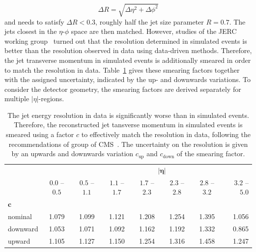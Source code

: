 \begin{equation}
\Delta R = \sqrt{\Delta \eta^2 + \Delta \phi^2}
\end{equation}
%
and needs to satisfy $\Delta R < 0.3$, roughly half the jet size parameter
$R=0.7$. The jets closest in the $\eta$-$\phi$ space are then matched. However,
studies of the \textsc{JERC} working group~\cite{jetmet:resolution} turned out that the resolution
determined in simulated events is better than the resolution observed in data
using data-driven methods. Therefore, the jet transverse momentum in simulated
events is additionally smeared in order to match the resolution in data.
Table~\ref{tab:res_smearing} gives these smearing factors together with the
assigned uncertainty, indicated by the up- and downwards variations. To consider
the detector geometry, the smearing factors are derived separately for multiple
$|\eta|$-regions.

\begin{table}[htbp]
\setlength\tabcolsep{4.5pt} 
    \centering
    \caption[Jet energy resolution scale factors]{
             The jet energy resolution in data is significantly worse than in
             simulated events. Therefore, the reconstructed jet tansverse
             momentum in simulated events is smeared using a factor $c$ to
             effectively match the resolution in data, following the
             recommendations of \JetMET group of CMS~\cite{jetmet:resolution}.
             The uncertainty on the resolution is given by an upwards and
             downwards variation $c_\mathrm{up}$ and
             $c_\mathrm{down}$ of the smearing factor.}
    \label{tab:res_smearing}

    \begin{tabular}{lccccccr}
    \toprule
    & & \multicolumn{6}{c}{$\bm{|\eta|}$}\\\cmidrule{2-8}
               & $0.0$ -- $0.5$ & $0.5$ -- $1.1$ & $1.1$ -- $1.7$ & $1.7$ --
               $2.3$ & $2.3$ -- $2.8$ & $2.8$ -- $3.2$ & $3.2$ -- $5.0$\\
               $\bm{c}$ &  &  &  & & & & \\\cmidrule{1-1}
    nominal    & 1.079                   & 1.099                   & 1.121    & 1.208                   & 1.254                   & 1.395    & 1.056\\
    downward       & 1.053                   & 1.071                   & 1.092    & 1.162                   & 1.192                   & 1.332 & 0.865\\
    upward         & 1.105                   & 1.127                   & 1.150 & 1.254                   & 1.316                   & 1.458 & 1.247\\
    \bottomrule
    \end{tabular}
\end{table}

